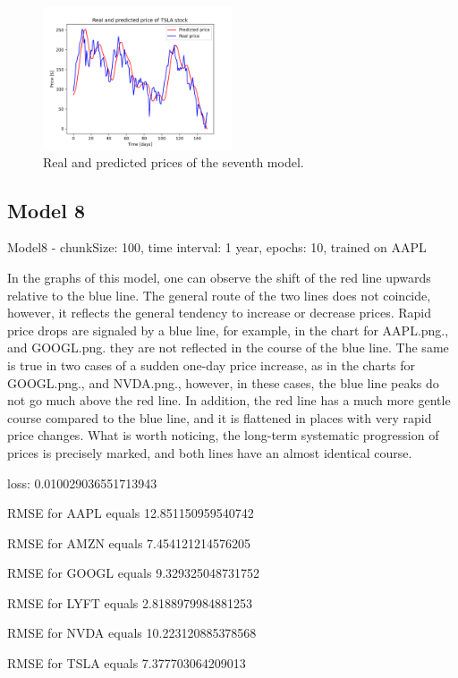\begin{figure}
\includegraphics[width=0.5\textwidth]{./graf/model7/TSLA.png}
\caption{Real and predicted prices of the seventh model.}
\label{fig:label}
\end{figure} 

\clearpage
\subsection{Model 8}

Model8 - chunkSize: 100, time interval: 1 year, epochs: 10, trained on AAPL\par\bigskip
In the graphs of this model, one can observe the shift of the red line upwards relative to the blue line.
The general route of the two lines does not coincide, however, it reflects the general tendency to
increase or decrease prices. Rapid price drops are signaled by a blue line, for example, in the chart for AAPL.png.,
and GOOGL.png. they are not reflected in the course of the blue line. The same is true in two cases of
a sudden one-day price increase, as in the charts for GOOGL.png., and NVDA.png.,
however, in these cases, the blue line peaks do not go much above the red line. In addition, the red
line has a much more gentle course compared to the blue line, and it is flattened in places with very rapid price changes. What is worth noticing, the long-term systematic progression of
prices is precisely marked, and both lines have an almost identical course.
\par\bigskip
loss: 0.010029036551713943\par
RMSE for AAPL equals 12.851150959540742\par
RMSE for AMZN equals 7.454121214576205\par
RMSE for GOOGL equals 9.329325048731752\par
RMSE for LYFT equals 2.8188979984881253\par
RMSE for NVDA equals 10.223120885378568\par
RMSE for TSLA equals 7.377703064209013\par

